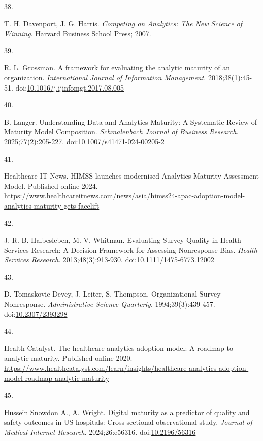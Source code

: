 \documentclass[
  american,
  11pt,
  letterpaper,
  oneside  ,captions=tableheading
]{scrartcl}
\newlength{\cslhangindent}
\newlength{\csllabelwidth}
\newenvironment{CSLReferences}[2] %
 {\begin{list}{}{%
  \setlength{\itemindent}{0pt}
  \setlength{\leftmargin}{0pt}
  \setlength{\parsep}{0pt}
  \ifodd #1
   \setlength{\leftmargin}{\cslhangindent}
   \setlength{\itemindent}{-1\cslhangindent}
  \fi
  \setlength{\itemsep}{#2\baselineskip}}}
 {\end{list}}
\newcommand{\CSLLeftMargin}[1]{\parbox[t]{\csllabelwidth}{\strut#1\strut}}
\newcommand{\CSLRightInline}[1]{\parbox[t]{\linewidth - \csllabelwidth}{\strut#1\strut}}
\begin{document}
\begin{CSLReferences}{0}{1}
\CSLLeftMargin{38. }%
\CSLRightInline{T. H. Davenport, J. G. Harris. \emph{{Competing on
Analytics: The New Science of Winning}}. Harvard Business School Press;
2007.}

\CSLLeftMargin{39. }%
\CSLRightInline{R. L. Grossman. {A framework for evaluating the analytic
maturity of an organization}. \emph{International Journal of Information
Management}. 2018;38(1):45-51.
doi:\href{https://doi.org/10.1016/j.ijinfomgt.2017.08.005}{10.1016/j.ijinfomgt.2017.08.005}}

\CSLLeftMargin{40. }%
\CSLRightInline{B. Langer. {Understanding Data and Analytics Maturity: A
Systematic Review of Maturity Model Composition}. \emph{Schmalenbach
Journal of Business Research}. 2025;77(2):205-227.
doi:\href{https://doi.org/10.1007/s41471-024-00205-2}{10.1007/s41471-024-00205-2}}

\CSLLeftMargin{41. }%
\CSLRightInline{Healthcare IT News. {HIMSS launches modernised Analytics
Maturity Assessment Model}. Published online 2024.
\url{https://www.healthcareitnews.com/news/asia/himss24-apac-adoption-model-analytics-maturity-gets-facelift}}

\CSLLeftMargin{42. }%
\CSLRightInline{J. R. B. Halbesleben, M. V. Whitman. {Evaluating Survey
Quality in Health Services Research: A Decision Framework for Assessing
Nonresponse Bias}. \emph{Health Services Research}. 2013;48(3):913-930.
doi:\href{https://doi.org/10.1111/1475-6773.12002}{10.1111/1475-6773.12002}}

\CSLLeftMargin{43. }%
\CSLRightInline{D. Tomaskovic-Devey, J. Leiter, S. Thompson.
{Organizational Survey Nonresponse}. \emph{Administrative Science
Quarterly}. 1994;39(3):439-457.
doi:\href{https://doi.org/10.2307/2393298}{10.2307/2393298}}

\CSLLeftMargin{44. }%
\CSLRightInline{Health Catalyst. {The healthcare analytics adoption
model: A roadmap to analytic maturity}. Published online 2020.
\url{https://www.healthcatalyst.com/learn/insights/healthcare-analytics-adoption-model-roadmap-analytic-maturity}}

\CSLLeftMargin{45. }%
\CSLRightInline{Hussein Snowdon A., A. Wright. {Digital maturity as a
predictor of quality and safety outcomes in {US} hospitals:
Cross-sectional observational study}. \emph{Journal of Medical Internet
Research}. 2024;26:e56316.
doi:\href{https://doi.org/10.2196/56316}{10.2196/56316}}


\end{CSLReferences}
\end{document}
